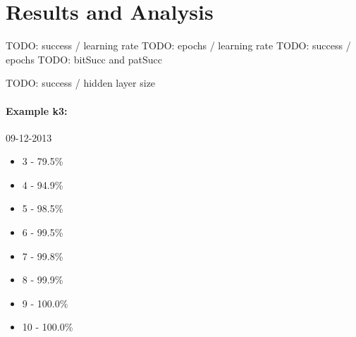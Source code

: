 
\section{Results and Analysis} 

TODO: success / learning rate 
TODO: epochs / learning rate 
TODO: success / epochs 
TODO: bitSucc and patSucc

TODO: success / hidden layer size 
\paragraph{Example k3:}
09-12-2013
\begin{itemize}  
\item 3  - 79.5\%
\item 4  - 94.9\%
\item 5  - 98.5\%
\item 6  - 99.5\%
\item 7  - 99.8\%
\item 8  - 99.9\%
\item 9  - 100.0\%
\item 10  - 100.0\%
\end{itemize} 

